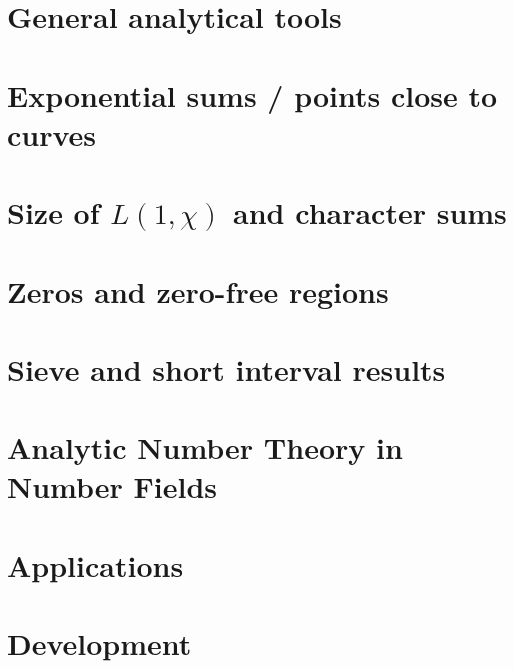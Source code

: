 \documentclass[10pt,twoside, svgnames]{book}
\begin{document}




\part{General analytical tools}





\part{Exponential sums / points close to curves}






\part{Size of $L(1,\chi)$ and character sums }




\part{Zeros and zero-free regions}




\part{Sieve and short interval results }




\part{Analytic Number Theory in Number Fields}




\part{Applications}




\part{Development}
\end{document}
